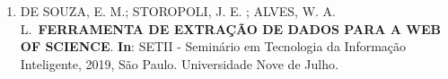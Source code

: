 \begin{enumerate}
     \item DE SOUZA, E. M.; STOROPOLI, J. E. ; ALVES, W. A. L.~\textbf{FERRAMENTA DE EXTRAÇÃO DE DADOS PARA A WEB OF SCIENCE}. \textbf{In}: SETII - Seminário em Tecnologia da Informação Inteligente, 2019, São Paulo. Universidade Nove de Julho.
\end{enumerate}
